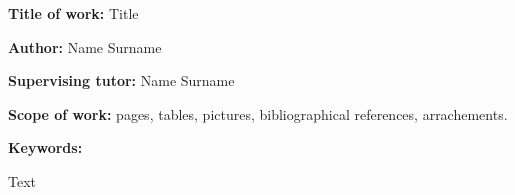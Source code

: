 \textbf{Title of work:} Title
\par \textbf{Author:} Name Surname
\par \textbf{Supervising tutor:} Name Surname
\par \textbf{Scope of work:} pages, tables, pictures, bibliographical references, arrachements.
\par \textbf{Keywords:}

Text